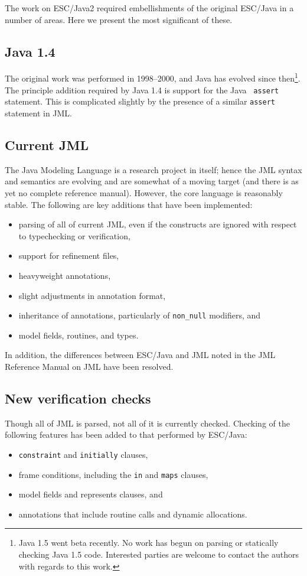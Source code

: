 \documentclass{acm_proc_article-sp}
\begin{document}
The work on ESC/Java2 required embellishments of the original ESC/Java
in a number of areas.  Here we present the most significant of these.
\subsection{Java 1.4}
The original work was performed in 1998--2000, and Java has evolved
since then\footnote{Java 1.5 went beta recently.  No work has begun on
  parsing or statically checking Java 1.5 code.  Interested parties
  are welcome to contact the authors with regards to this work.}.  The
principle addition required by Java 1.4 is support for the Java {\tt
  assert} statement.  This is complicated slightly by the presence of
a similar {\tt assert} statement in JML.

\subsection{Current JML}
The Java Modeling Language is a research project in itself; hence the
JML syntax and semantics are evolving and are somewhat of a moving
target (and there is as yet no complete reference manual).  However,
the core language is reasonably stable.  The following are key
additions that have been implemented:
\setlength{\partopsep}{0in}\setlength{\parskip}{0in}
\begin{itemize}\setlength{\itemsep}{0in}
\item parsing of all of current JML, even if the constructs are
  ignored with respect to typechecking or verification,
\item support for refinement files,
\item heavyweight annotations,
\item slight adjustments in annotation format,
\item inheritance of annotations, particularly of {\tt non\_null}
  modifiers, and
\item model fields, routines, and types.
\end{itemize}
In addition, the differences between ESC/Java and JML noted in the JML
Reference Manual on JML have been resolved.

\subsection{New verification checks}
Though all of JML is parsed, not all of it is currently checked.
Checking of the following features has been added to that performed by
ESC/Java: \setlength{\partopsep}{0in}\setlength{\parskip}{0in}
\begin{itemize}\setlength{\itemsep}{0in}
\item {\tt constraint} and {\tt initially} clauses,
\item frame conditions, including the {\tt in} and {\tt maps} clauses,
\item model fields and represents clauses, and
\item annotations that include routine calls and dynamic allocations.
\end{itemize}
\end{document}

